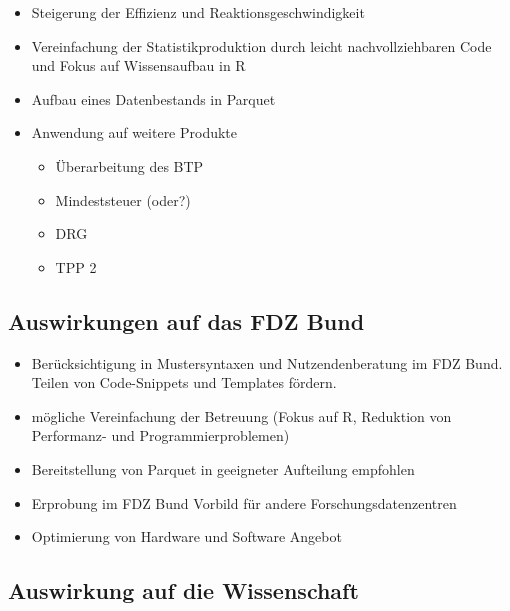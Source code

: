 \documentclass[
  german,
  10pt,
  twoside]{article}
\providecommand{\tightlist}{%
  \setlength{\itemsep}{0pt}\setlength{\parskip}{0pt}}
\begin{document}
\begin{itemize}
\tightlist
\item
  Steigerung der Effizienz und Reaktionsgeschwindigkeit
\item
  Vereinfachung der Statistikproduktion durch leicht nachvollziehbaren
  Code und Fokus auf Wissensaufbau in R
\item
  Aufbau eines Datenbestands in Parquet
\item
  Anwendung auf weitere Produkte

  \begin{itemize}
  \tightlist
  \item
    Überarbeitung des BTP
  \item
    Mindeststeuer (oder?)
  \item
    DRG
  \item
    TPP 2
  \end{itemize}
\end{itemize}

\subsection{Auswirkungen auf das FDZ
Bund}\label{auswirkungen-auf-das-fdz-bund}

\begin{itemize}
\tightlist
\item
  Berücksichtigung in Mustersyntaxen und Nutzendenberatung im FDZ Bund.
  Teilen von Code-Snippets und Templates fördern.
\item
  mögliche Vereinfachung der Betreuung (Fokus auf R, Reduktion von
  Performanz- und Programmierproblemen)
\item
  Bereitstellung von Parquet in geeigneter Aufteilung empfohlen
\item
  Erprobung im FDZ Bund Vorbild für andere Forschungsdatenzentren
\item
  Optimierung von Hardware und Software Angebot
\end{itemize}

\subsection{Auswirkung auf die
Wissenschaft}\label{auswirkung-auf-die-wissenschaft}
\end{document}
